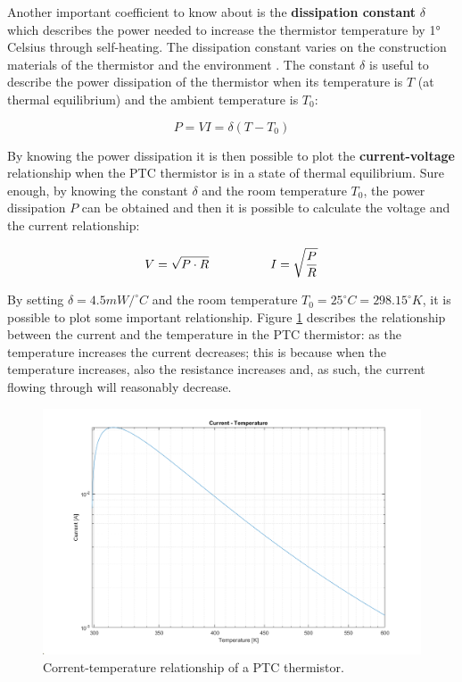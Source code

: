 Another important coefficient to know about is the \textbf{dissipation constant} $\delta$ which describes the power needed to increase the thermistor temperature by 1° Celsius through self-heating. The dissipation constant varies on the construction materials of the thermistor and the environment \cite{Saburi196353}. The constant $\delta$ is useful to describe the power dissipation of the thermistor when its temperature is $T$ (at thermal equilibrium) and the ambient temperature is $T_0$:

\begin{equation*}
    P = VI = \delta(T - T_0)
\end{equation*}

\noindent By knowing the power dissipation it is then possible to plot the \textbf{current-voltage} relationship when the PTC thermistor is in a state of thermal equilibrium. Sure enough, by knowing the constant $\delta$ and the room temperature $T_0$, the power dissipation $P$ can be obtained and then it is possible to calculate the voltage and the current relationship:

\begin{equation*}
    V = \sqrt{P \cdot R} \hspace{50px} I = \sqrt{\frac{P}{R}}
\end{equation*}

\noindent By setting $\delta = 4.5 mW/^{\circ}C$ and the room temperature $T_0 = 25^{\circ}C = 298.15^{\circ} K$, it is possible to plot some important relationship. Figure \ref{fig:PTC_curr-temp} describes the relationship between the current and the temperature in the PTC thermistor: as the temperature increases the current decreases; this is because when the temperature increases, also the resistance increases and, as such, the current flowing through will reasonably decrease.

\begin{figure}[h]
    \centering
    \includegraphics[width = .75\textwidth]{../res/plots/PTC_curr-temp.png}
    \caption{Corrent-temperature relationship of a PTC thermistor.}
    \label{fig:PTC_curr-temp}
\end{figure}


